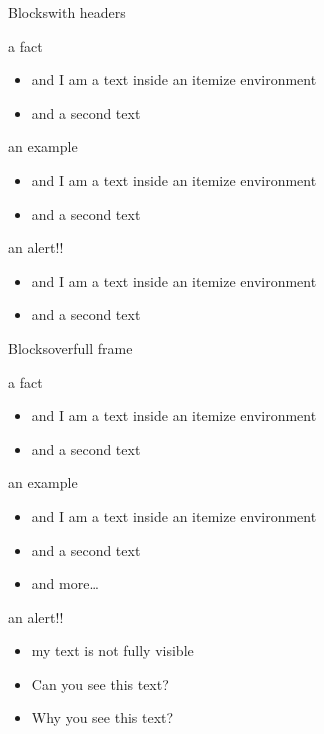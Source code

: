 \documentclass[]{beamer}
\begin{document}
\begin{frame}{Blocks}{with headers}
\begin{block}{a fact}
\begin{itemize}
\item and I am a text inside an itemize environment
\item and a second text
\end{itemize}
\end{block}

\vfill

\begin{exampleblock}{an example}
\begin{itemize}
\item and I am a text inside an itemize environment
\item and a second text
\end{itemize}
\end{exampleblock}

\vfill

\begin{alertblock}{an alert!!}
\begin{itemize}
\item and I am a text inside an itemize environment
\item and a second text
\end{itemize}
\end{alertblock}
\end{frame}


\begin{frame}{Blocks}{overfull frame}
\begin{block}{a fact}
\begin{itemize}
\item and I am a text inside an itemize environment
\item and a second text
\end{itemize}
\end{block}

\vfill

\begin{exampleblock}{an example}
\begin{itemize}
\item and I am a text inside an itemize environment
\item and a second text
\item and more\ldots
\end{itemize}
\end{exampleblock}

\vfill

\begin{alertblock}{an alert!!}
\begin{itemize}
\item my text is not fully visible
\item Can you see this text?
\item Why you see this text?
\end{itemize}
\end{alertblock}
\end{frame}
\end{document}
